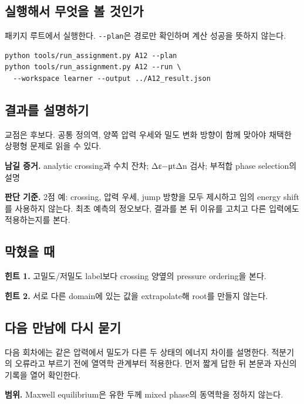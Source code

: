 \documentclass[
  10pt,
  a4paper,
]{article}
\begin{document}
\newpage

\subsection{실행해서 무엇을 볼
것인가}\label{uxc2e4uxd589uxd574uxc11c-uxbb34uxc5c7uxc744-uxbcfc-uxac83uxc778uxac00}

패키지 루트에서 실행한다. \texttt{-\/-plan}은 경로만 확인하며 계산
성공을 뜻하지 않는다.

\begin{verbatim}
python tools/run_assignment.py A12 --plan
python tools/run_assignment.py A12 --run \
  --workspace learner --output ../A12_result.json
\end{verbatim}

\subsection{결과를
설명하기}\label{uxacb0uxacfcuxb97c-uxc124uxba85uxd558uxae30}

교점은 후보다. 공통 정의역, 양쪽 압력 우세와 밀도 변화 방향이 함께
맞아야 채택한 상평형 문제로 읽을 수 있다.

\textbf{남길 증거.} analytic crossing과 수치 잔차; Δε−μtΔn 검사; 부적합
phase selection의 설명

\textbf{판단 기준.} 2점 예: crossing, 압력 우세, jump 방향을 모두
제시하고 임의 energy shift를 사용하지 않는다. 최초 예측의 정오보다,
결과를 본 뒤 이유를 고치고 다른 입력에도 적용하는지를 본다.

\subsection{막혔을 때}\label{uxb9c9uxd614uxc744-uxb54c}

\textbf{힌트 1.} 고밀도/저밀도 label보다 crossing 양옆의 pressure
ordering을 본다.

\textbf{힌트 2.} 서로 다른 domain에 있는 값을 extrapolate해 root를
만들지 않는다.

\subsection{다음 만남에 다시
묻기}\label{uxb2e4uxc74c-uxb9ccuxb0a8uxc5d0-uxb2e4uxc2dc-uxbb3buxae30}

다음 회차에는 같은 압력에서 밀도가 다른 두 상태의 에너지 차이를
설명한다. 적분기의 오류라고 부르기 전에 열역학 관계부터 적용한다. 먼저
짧게 답한 뒤 본문과 자신의 기록을 열어 확인한다.

\textbf{범위.} Maxwell equilibrium은 유한 두께 mixed phase의 동역학을
정하지 않는다.
\end{document}

